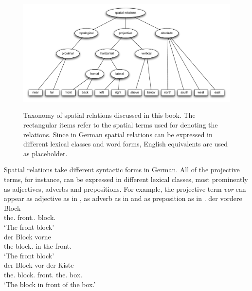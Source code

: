 \begin{figure}
\includegraphics[width=\columnwidth]{figs/spatial-relations-taxonomy}
\label{f:spatial-relations-taxonomy}
\caption[Taxonomy of spatial relations in German.]{%
Taxonomy of spatial relations discussed in this book.
The rectangular items refer to the spatial terms used for denoting
the relations. Since in German spatial relations can be expressed in
different lexical classes and word forms, English
equivalents are used as placeholder.}
\end{figure}

Spatial relations take different syntactic forms in German. 
All of the projective terms, for instance, can be expressed in different 
lexical classes, most prominently as adjectives, adverbs and prepositions. 
For example, the projective term \textit{vor} can appear as adjective as in 
, as adverb as in  
and as preposition as in . 
\ea
\label{e:der-vordere-block}
\gll der vordere Block\\
the.{\NOM} front.{\ADJ}.{\NOM} block.{\NOM} \\
\glt `The front block'\\
\z
\ea
\label{e:der-block-vorne}
\gll der Block vorne\\
the block.{\NOM} {in the front.{\ADV}} \\
\glt `The front block'\\
\z
\ea
\label{e:der-block-vor-der-kiste}
\gll der Block vor der Kiste\\
the.{\NOM} block.{\NOM} front.{\PREP} the.{\DAT} box.{\DAT} \\
\glt `The block in front of the box.'\\
\z

